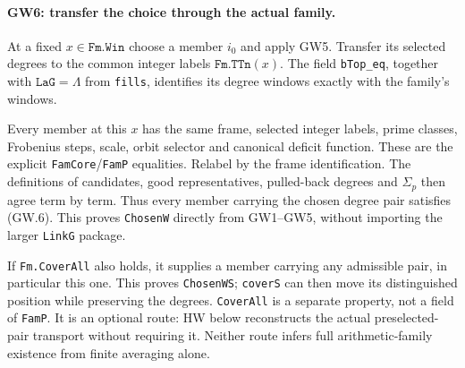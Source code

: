 \paragraph{GW6: transfer the choice through the actual family.}
At a fixed $x\in\texttt{Fm.Win}$ choose a member $i_0$ and apply GW5.
Transfer its selected degrees to the common integer labels
$\texttt{Fm.TTn}(x)$. The field \texttt{bTop\_eq}, together with
$\texttt{LaG}=\Lambda$ from \texttt{fills}, identifies its degree
windows exactly with the family's windows.

Every member at this $x$ has the same frame, selected integer labels,
prime classes, Frobenius steps, scale, orbit selector and canonical
deficit function. These are the explicit \texttt{FamCore}/\texttt{FamP}
equalities. Relabel by the frame identification. The definitions of
candidates, good representatives, pulled-back degrees and $\Sigma_p$
then agree term by term. Thus every member carrying the chosen degree
pair satisfies (GW.6). This proves \texttt{ChosenW} directly from
GW1--GW5, without importing the larger \texttt{LinkG} package.

If \texttt{Fm.CoverAll} also holds, it supplies a member carrying
any admissible pair, in particular this one. This proves
\texttt{ChosenWS}; \texttt{coverS} can then move its distinguished
position while preserving the degrees. \texttt{CoverAll} is a
separate property, not a field of \texttt{FamP}. It is an optional
route: HW below reconstructs the actual preselected-pair transport
without requiring it. Neither route infers full arithmetic-family
existence from finite averaging alone.
